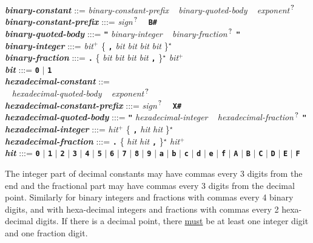 \documentclass[12pt]{article}
\newcommand{\TT}[1]{{\tt \bfseries #1}}
\newcommand{\STAR}{{\Large $^\star$}}
\newcommand{\PLUS}[1][]{{$^{+#1}$}}
\newcommand{\QMARK}{{$^{\,\mbox{\footnotesize ?}}$}}
\newcommand{\emkey}[1]{{\em \bfseries #1}}
\newenvironment{indpar}[1][0.3in]%
	{\begin{list}{}%
		     {\setlength{\itemsep}{0in}%
		      \setlength{\topsep}{0in}%
		      \setlength{\parsep}{1ex}%
		      \setlength{\labelwidth}{#1}%
		      \setlength{\leftmargin}{#1}%
		      \addtolength{\leftmargin}{\labelsep}}%
	 \item}%
	{\end{list}}
\begin{document}
\begin{indpar}
 \\[0.5ex]
\emkey{binary-constant} ::= {\em binary-constant-prefix} ~
                              {\em binary-quoted-body} ~
			      {\em exponent}\QMARK{}
\\[0.5ex]
\emkey{binary-constant-prefix} :::= {\em sign}\QMARK{} ~ \TT{B\#}
\\[0.5ex]
\emkey{binary-quoted-body} :::= \TT{"} {\em binary-integer} ~
				{\em binary-fraction}\QMARK{} \TT{"}
\\[0.5ex]
\emkey{binary-integer}
    :::= {\em bit}\PLUS{}
           \{ \TT{,} {\em bit} {\em bit} {\em bit} {\em bit} \}\STAR{} \\
\emkey{binary-fraction} :::=
    \TT{.} \{ {\em bit} {\em bit} {\em bit} {\em bit} \TT{,} \}\STAR{}
    {\em bit}\PLUS{} \\
\emkey{bit} :::= \TT{0} $|$ \TT{1}
 \\[0.5ex]
\emkey{hexadecimal-constant} ::= \\
\hspace*{0.5in}{\em hexadecimal-constant-prefix} ~
               {\em hexadecimal-quoted-body} ~
	       {\em exponent}\QMARK{}
\\[0.5ex]
\emkey{hexadecimal-constant-prefix} :::= {\em sign}\QMARK{} ~ \TT{X\#}
\\[0.5ex]
\emkey{hexadecimal-quoted-body} :::= \TT{"} {\em hexadecimal-integer} ~
				     {\em hexadecimal-fraction}\QMARK{} \TT{"}
\\[0.5ex]
\emkey{hexadecimal-integer}
    :::= {\em hit}\PLUS{}
           \{ \TT{,} {\em hit} {\em hit} \}\STAR{} \\
\emkey{hexadecimal-fraction} :::=
    \TT{.} \{ {\em hit} {\em hit} \TT{,} \}\STAR{}
    {\em hit}\PLUS{} \\
\emkey{hit} :::= \TT{0} $|$ \TT{1} $|$ \TT{2} $|$ \TT{3} $|$ \TT{4}
	     $|$ \TT{5} $|$ \TT{6} $|$ \TT{7} $|$ \TT{8} $|$ \TT{9}
	     $|$ \TT{a} $|$ \TT{b} $|$ \TT{c} $|$ \TT{d} $|$ \TT{e} $|$ \TT{f}
	     $|$ \TT{A} $|$ \TT{B} $|$ \TT{C} $|$ \TT{D} $|$ \TT{E} $|$ \TT{F}
\end{indpar}

The integer part of decimal constants may have commas
every 3 digits from the end and the fractional part may have
commas every 3 digits from the decimal point.
Similarly for binary integers and fractions with commas every 4 binary
digits,
and with hexa-decimal integers and fractions with commas every 2
hexa-decimal digits.
If there is a decimal point, there \underline{must}
be at least one integer digit and
one fraction digit.
\end{document}
